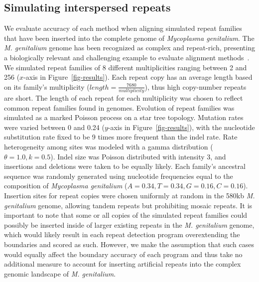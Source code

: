 \documentclass[12pt,journal,letterpaper,onecolumn, draftcls]{IEEEtran}
\begin{document}
\subsection*{Simulating interspersed repeats}
We evaluate accuracy of each method when aligning simulated repeat
families that have been inserted into the complete genome of
\emph{Mycoplasma genitalium}. The \emph{M. genitalium} genome has been recognized
as complex and repeat-rich, presenting a biologically
relevant and challenging example to evaluate alignment
methods~\cite{ref-mycoplasma}. We simulated repeat families of 8
different multiplicities ranging between 2 and 256 ($x$-axis in
Figure~\ref{fig-results}).  Each repeat copy has an average length
based on its family's multiplicity
($length=\frac{7680}{multiplicity}$), thus high copy-number repeats
are short.  The length of each repeat for each multiplicity was chosen
to reflect common repeat families found in genomes. Evolution of repeat families was simulated as a marked
Poisson process on a star tree
topology.  Mutation rates were varied between 0 and 0.24 ($y$-axis
in Figure~\ref{fig-results}), with the nucleotide substitution rate
fixed to be 9 times more frequent than the indel rate.  Rate heterogeneity among sites was modeled with a gamma
distribution ($\theta = 1.0, k = 0.5$).  Indel size was
Poisson distributed with intensity 3, and insertions and deletions
were taken to be equally likely.  Each family's ancestral
sequence was randomly generated using nucleotide frequencies equal to
the composition of \emph{Mycoplasma genitalium}
($A=0.34,T=0.34,G=0.16,C=0.16$). Insertion sites for repeat copies
were chosen uniformly at random in the 580kb \textit{M. genitalium} genome,
allowing tandem repeats but prohibiting mosaic repeats. It is important to note that some or all copies of the simulated repeat families
could possibly be inserted inside of larger existing repeats in the  \textit{M. genitalium} genome, which would
likely result in each repeat detection program overextending the boundaries and scored as such. However, we make the assumption
that such cases would equally affect the boundary accuracy of each program and thus take no additional measure to account for inserting
artificial repeats into the complex genomic landscape of \textit{M. genitalium}.
\end{document}
